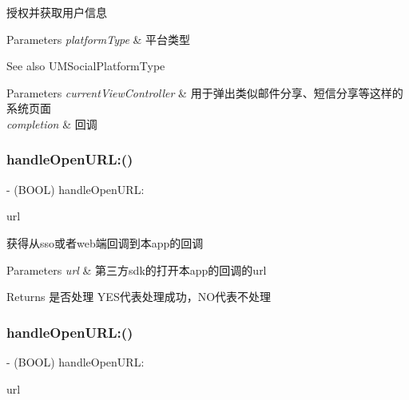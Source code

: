 授权并获取用户信息 
\begin{DoxyParams}{Parameters}
{\em platform\+Type} & 平台类型 \\
\hline
\end{DoxyParams}
\begin{DoxySeeAlso}{See also}
U\+M\+Social\+Platform\+Type 
\end{DoxySeeAlso}

\begin{DoxyParams}{Parameters}
{\em current\+View\+Controller} & 用于弹出类似邮件分享、短信分享等这样的系统页面 \\
\hline
{\em completion} & 回调 \\
\hline
\end{DoxyParams}
\mbox{\label{interface_u_m_social_manager_a4f30d7074df154fe5d69ef769603024d}} 
\subsubsection{\texorpdfstring{handle\+Open\+U\+R\+L\+:()}{handleOpenURL:()}\hspace{0.1cm}{\footnotesize\ttfamily [1/2]}}
{\footnotesize\ttfamily -\/ (B\+O\+OL) handle\+Open\+U\+R\+L\+: \begin{DoxyParamCaption}\item[{(N\+S\+U\+RL $\ast$)}]{url }\end{DoxyParamCaption}}

获得从sso或者web端回调到本app的回调


\begin{DoxyParams}{Parameters}
{\em url} & 第三方sdk的打开本app的回调的url\\
\hline
\end{DoxyParams}
\begin{DoxyReturn}{Returns}
是否处理 Y\+E\+S代表处理成功，\+N\+O代表不处理 
\end{DoxyReturn}
\mbox{\label{interface_u_m_social_manager_a4f30d7074df154fe5d69ef769603024d}} 
\subsubsection{\texorpdfstring{handle\+Open\+U\+R\+L\+:()}{handleOpenURL:()}\hspace{0.1cm}{\footnotesize\ttfamily [2/2]}}
{\footnotesize\ttfamily -\/ (B\+O\+OL) handle\+Open\+U\+R\+L\+: \begin{DoxyParamCaption}\item[{(N\+S\+U\+RL $\ast$)}]{url }\end{DoxyParamCaption}}

